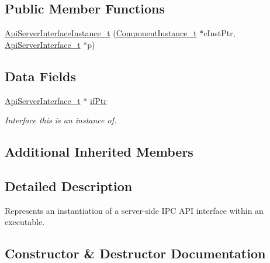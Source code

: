 \subsection*{Public Member Functions}
\begin{DoxyCompactItemize}
\item 
\hyperlink{struct_api_server_interface_instance__t_a4c7eaad472f72b1a37b23d96cdc931b9}{Api\+Server\+Interface\+Instance\+\_\+t} (\hyperlink{struct_component_instance__t}{Component\+Instance\+\_\+t} $\ast$c\+Inst\+Ptr, \hyperlink{struct_api_server_interface__t}{Api\+Server\+Interface\+\_\+t} $\ast$p)
\end{DoxyCompactItemize}
\subsection*{Data Fields}
\begin{DoxyCompactItemize}
\item 
\hyperlink{struct_api_server_interface__t}{Api\+Server\+Interface\+\_\+t} $\ast$ \hyperlink{struct_api_server_interface_instance__t_a2f369377cf7590ac89ad7a9581a90a0d}{if\+Ptr}
\begin{DoxyCompactList}\small\item\em Interface this is an instance of. \end{DoxyCompactList}\end{DoxyCompactItemize}
\subsection*{Additional Inherited Members}


\subsection{Detailed Description}
Represents an instantiation of a server-\/side I\+PC A\+PI interface within an executable. 

\subsection{Constructor \& Destructor Documentation}
